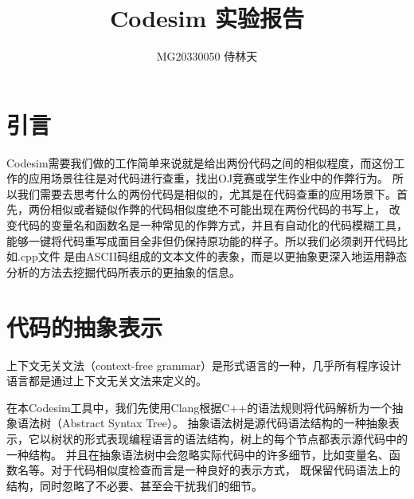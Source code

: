 \documentclass[UTF8]{article}
\begin{document}
\title{Codesim 实验报告}

\author{MG20330050 侍林天}

\maketitle

\section{引言}

Codesim需要我们做的工作简单来说就是给出两份代码之间的相似程度，而这份工作的应用场景往往是对代码进行查重，找出OJ竞赛或学生作业中的作弊行为。
所以我们需要去思考什么的两份代码是相似的，尤其是在代码查重的应用场景下。首先，两份相似或者疑似作弊的代码相似度绝不可能出现在两份代码的书写上，
改变代码的变量名和函数名是一种常见的作弊方式，并且有自动化的代码模糊工具，能够一键将代码重写成面目全非但仍保持原功能的样子。所以我们必须剥开代码比如.cpp文件
是由ASCII码组成的文本文件的表象，而是以更抽象更深入地运用静态分析的方法去挖掘代码所表示的更抽象的信息。

\section{代码的抽象表示}

上下文无关文法（context-free grammar）是形式语言的一种，几乎所有程序设计语言都是通过上下文无关文法来定义的。

在本Codesim工具中，我们先使用Clang根据C++的语法规则将代码解析为一个抽象语法树（Abstract Syntax Tree）。
抽象语法树是源代码语法结构的一种抽象表示，它以树状的形式表现编程语言的语法结构，树上的每个节点都表示源代码中的一种结构。
并且在抽象语法树中会忽略实际代码中的许多细节，比如变量名、函数名等。对于代码相似度检查而言是一种良好的表示方式，
既保留代码语法上的结构，同时忽略了不必要、甚至会干扰我们的细节。
\end{document}
